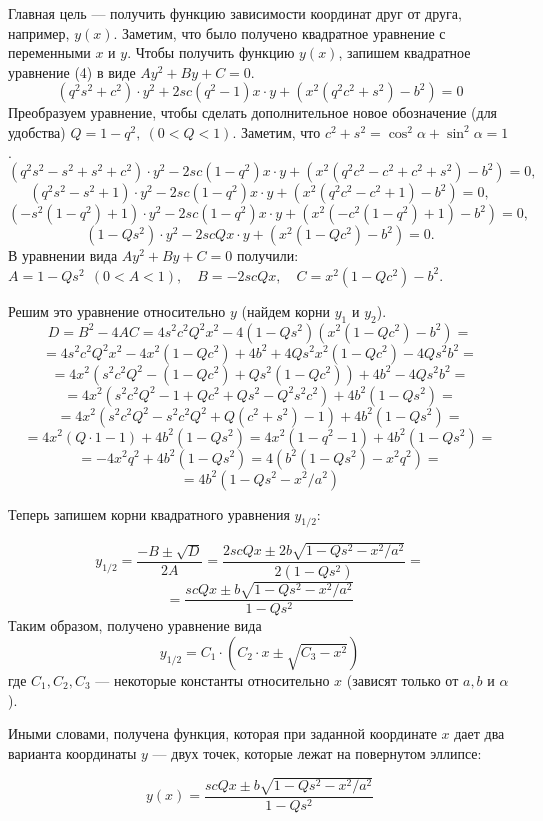 \documentclass[14pt, a4paper]{article}
\begin{document}
Главная цель — получить функцию зависимости координат друг от друга, например, $y(x)$. Заметим, что было получено квадратное уравнение с переменными $x$ и $y$. Чтобы получить функцию $y(x)$, запишем квадратное уравнение (4) в виде $Ay^2 + By + C = 0$.
\begin{equation*}
	(q^2s^2 + c^2)\cdot y^2 + 2sc(q^2-1)x\cdot y + (x^2(q^2c^2+s^2)-b^2) = 0
\end{equation*}
Преобразуем уравнение, чтобы сделать дополнительное новое обозначение (для удобства) $Q=1-q^2, \ (0<Q<1)$. Заметим, что $c^2 + s^2 = \cos^2\alpha + \sin^2\alpha = 1$.
$$
	(q^2s^2 - s^2 + s^2 + c^2)\cdot y^2 - 2sc(1-q^2)x\cdot y + (x^2(q^2c^2 - c^2 + c^2 + s^2)-b^2) = 0,
$$
$$
	(q^2s^2 - s^2 + 1)\cdot y^2 - 2sc(1-q^2)x\cdot y + (x^2(q^2c^2 - c^2 + 1)-b^2) = 0,
$$
$$
	(-s^2(1-q^2) + 1)\cdot y^2 - 2sc(1-q^2)x\cdot y + (x^2(-c^2(1-q^2) + 1)-b^2) = 0,
$$
$$
	(1-Qs^2)\cdot y^2 - 2scQx\cdot y + (x^2(1-Qc^2)-b^2) = 0.
$$
В уравнении вида $Ay^2 + By + C = 0$ получили: $A=1-Qs^2 \ \ (0 < A < 1), \quad B = -2scQx, \quad C = x^2(1-Qc^2)-b^2 $. 

Решим это уравнение относительно $y$ (найдем корни $y_1$ и $y_2$).
$$
	D = B^2 - 4AC = 4s^2c^2Q^2x^2 - 4(1-Qs^2)(x^2(1-Qc^2)-b^2) =
$$
$$
	= 4s^2c^2Q^2x^2 - 4x^2(1-Qc^2) + 4b^2 + 4Qs^2x^2(1-Qc^2) - 4Qs^2b^2 = 
$$
$$
	= 4x^2(s^2c^2Q^2 - (1-Qc^2) + Qs^2(1-Qc^2)) + 4b^2 - 4Qs^2b^2 =
$$
$$
	= 4x^2(s^2c^2Q^2 - 1 + Qc^2 + Qs^2 - Q^2s^2c^2) + 4b^2(1-Qs^2) =
$$
$$
	= 4x^2(s^2c^2Q^2-s^2c^2Q^2 + Q(c^2+s^2) - 1) + 4b^2(1-Qs^2)	 =
$$
$$
	= 4x^2(Q\cdot 1 - 1) + 4b^2(1-Qs^2) = 4x^2(1-q^2 - 1) + 4b^2(1-Qs^2) =
$$
$$
	= -4x^2q^2 + 4b^2(1-Qs^2) = 4(b^2(1-Qs^2) - x^2q^2) =
$$
$$
	= 4b^2(1-Qs^2 - x^2/a^2)
$$

Теперь запишем корни квадратного уравнения $y_{1/2}$:

$$
	y_{1/2} = \frac{-B \pm \sqrt{D}}{2A} = \frac{2scQx \pm 2b\sqrt{1-Qs^2-x^2/a^2}}{2(1-Qs^2)} =
$$
$$
	= \frac{scQx \pm b\sqrt{1-Qs^2-x^2/a^2}}{1-Qs^2}
$$
Таким образом, получено уравнение вида
$$ y_{1/2} = C_1\cdot (C_2\cdot x\pm\sqrt{C_3-x^2})$$
где $C_1, C_2, C_3$ — некоторые константы относительно $x$ (зависят только от $a, b$ и $\alpha$).

Иными словами, получена функция, которая при заданной координате $x$ дает два варианта координаты $y$ — двух точек, которые лежат на повернутом эллипсе:

\begin{equation}
	y(x) = \frac{scQx \pm b\sqrt{1-Qs^2-x^2/a^2}}{1-Qs^2}
\end{equation}
\end{document}
